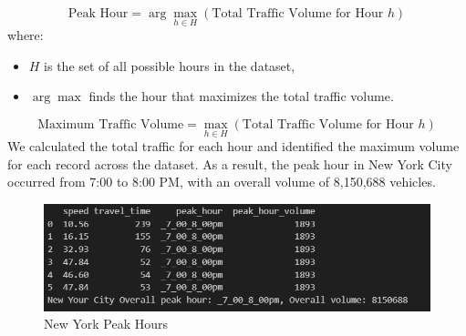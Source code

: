 \begin{equation}
\text{Peak Hour} = \arg \max_{h \in H} \left( \text{Total Traffic Volume for Hour } h \right)
\end{equation}
where:
\begin{itemize}
    \item \( H \) is the set of all possible hours in the dataset,
    \item \( \arg \max \) finds the hour that maximizes the total traffic volume.
\end{itemize}

\begin{equation}
\text{Maximum Traffic Volume} = \max_{h \in H} \left( \text{Total Traffic Volume for Hour } h \right)
\end{equation}
\newline
We calculated the total traffic for each hour and identified the maximum volume for each record across the dataset. As a result, the peak hour in New York City occurred from 7:00 to 8:00 PM, with an overall volume of 8,150,688 vehicles.
\begin{figure}[H]
    \centering
    \includegraphics[width=1\linewidth]{figures/peak_huours.PNG}
    \caption{New York Peak Hours}
    \label{fig:New York Peak Hours}
\end{figure}

